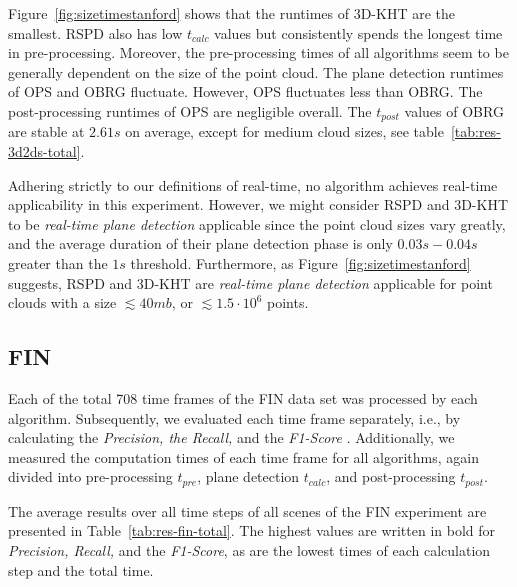 \documentclass[main.tex]{subfiles}
\begin{document}
Figure~\ref{fig:sizetimestanford} shows that the runtimes of 3D-KHT are the smallest. RSPD also has low $t_{calc}$ values
but consistently spends the longest time in pre-processing.
Moreover, the pre-processing times of all algorithms seem to be generally dependent on the size of the point cloud.
The plane detection runtimes of OPS and OBRG fluctuate. However, OPS fluctuates less than OBRG.
The post-processing runtimes of OPS are negligible overall. The $t_{post}$ values of OBRG are stable at $2.61s$ on average,
except for medium cloud sizes, see table~\ref{tab:res-3d2ds-total}.

Adhering strictly to our definitions of real-time, no algorithm achieves real-time applicability in this experiment.
However, we might consider RSPD and 3D-KHT to be \textit{real-time plane detection} applicable since
the point cloud sizes vary greatly, and the average duration of their plane detection phase is only
$0.03s-0.04s$ greater than the $1s$ threshold.
Furthermore, as Figure~\ref{fig:sizetimestanford} suggests, RSPD and 3D-KHT are
\textit{real-time plane detection} applicable for point clouds with a size ${\lesssim}40mb$, or
${\lesssim}1.5{\cdot}10^6$ points.

\subsection{FIN}
Each of the total 708 time frames of the FIN data set was processed by each algorithm.
Subsequently, we evaluated each time frame separately, i.e., by calculating the \textit{Precision, the Recall,} and the \textit{F1-Score} .
Additionally, we measured the computation times of each time frame for all algorithms, again divided into pre-processing $t_{pre}$,
plane detection $t_{calc}$, and post-processing $t_{post}$.

The average results over all time steps of all scenes of the FIN experiment are presented in Table~\ref{tab:res-fin-total}.
The highest values are written in bold for \textit{Precision, Recall,} and the \textit{F1-Score}, as are the lowest times of each calculation step and the 
total time.
\end{document}
